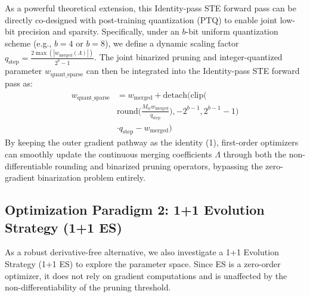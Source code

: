 As a powerful theoretical extension, this Identity-pass STE forward pass can be directly co-designed with post-training quantization (PTQ) to enable joint low-bit precision and sparsity. Specifically, under an $b$-bit uniform quantization scheme (e.g., $b=4$ or $b=8$), we define a dynamic scaling factor $q_{\text{step}} = \frac{2 \max(|w_{\text{merged}}(\Lambda)|)}{2^b - 1}$. The joint binarized pruning and integer-quantized parameter $w_{\text{quant\_sparse}}$ can then be integrated into the Identity-pass STE forward pass as:
\begin{equation}
\begin{aligned}
    w_{\text{quant\_sparse}} &= w_{\text{merged}} + \text{detach}\Big(\text{clip}\Big( \\
    &\text{round}\Big(\frac{M_w w_{\text{merged}}}{q_{\text{step}}}\Big), -2^{b-1}, 2^{b-1}-1\Big) \\
    &\cdot q_{\text{step}} - w_{\text{merged}}\Big)
\end{aligned}
\end{equation}
By keeping the outer gradient pathway as the identity (1), first-order optimizers can smoothly update the continuous merging coefficients $\Lambda$ through both the non-differentiable rounding and binarized pruning operators, bypassing the zero-gradient binarization problem entirely.

\subsection{Optimization Paradigm 2: 1+1 Evolution Strategy (1+1 ES)}

As a robust derivative-free alternative, we also investigate a 1+1 Evolution Strategy (1+1 ES) \cite{salimans2017evolution} to explore the parameter space. Since ES is a zero-order optimizer, it does not rely on gradient computations and is unaffected by the non-differentiability of the pruning threshold.

